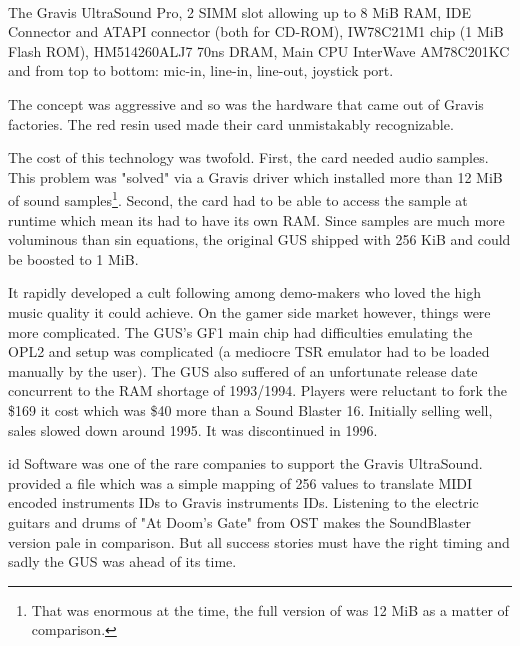 \\
\par
The Gravis UltraSound Pro,  2 SIMM slot allowing up to 8 MiB RAM,  IDE Connector and  ATAPI connector (both for CD-ROM),  IW78C21M1 chip (1 MiB Flash ROM),  HM514260ALJ7 70ns DRAM,  Main CPU InterWave AM78C201KC and  from top to bottom: mic-in, line-in, line-out, joystick port.\\

The concept was aggressive and so was the hardware that came out of Gravis factories. The red resin used made their card unmistakably recognizable.\\
\par
The cost of this technology was twofold. First, the card needed audio samples. This problem was "solved" via a Gravis driver which installed more than 12 MiB of sound samples\footnote{That was enormous at the time, the full version of \doom{} was 12 MiB as a matter of comparison.}. Second, the card had to be able to access the sample at runtime which mean its had to have its own RAM. Since samples are much more voluminous than sin equations, the original GUS shipped with 256 KiB and could be boosted to 1 MiB.\\
\par
It rapidly developed a cult following among demo-makers who loved the high music quality it could achieve. On the gamer side market however, things were more complicated. The GUS's GF1 main chip had difficulties emulating the OPL2 and setup was complicated (a mediocre TSR emulator had to be loaded manually by the user). The GUS also suffered of an unfortunate release date concurrent to the RAM shortage of 1993/1994. Players were reluctant to fork the \$169 it cost which was \$40 more than a Sound Blaster 16. Initially selling well, sales slowed down around 1995. It was discontinued in 1996.\\
\par
 id Software was one of the rare companies to support the Gravis UltraSound. \doom{} provided a  file which was a simple mapping of 256 values to translate MIDI encoded instruments IDs to Gravis instruments IDs. Listening to the electric guitars and drums of "At Doom's Gate" from \doom{} OST makes the SoundBlaster version pale in comparison. But all success stories must have the right timing and sadly the GUS was ahead of its time.

